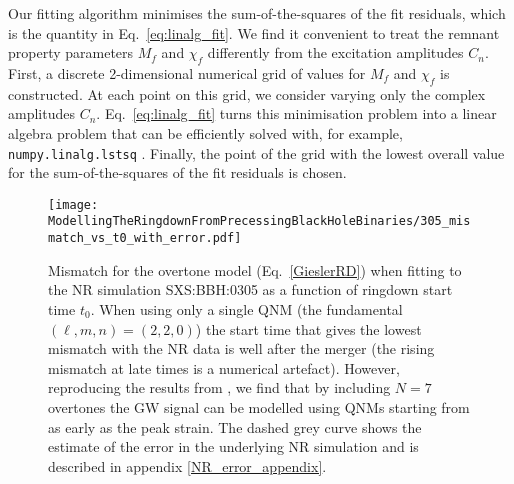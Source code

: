 Our fitting algorithm minimises the sum-of-the-squares of the fit residuals, which is the quantity in Eq.~\ref{eq:linalg_fit}. 
We find it convenient to treat the remnant property parameters $M_f$ and $\chi_f$ differently from the excitation amplitudes $C_n$. 
First, a discrete 2-dimensional numerical grid of values for 
$M_f$ and $\chi_f$ is constructed.
At each point on this grid, we consider varying only the complex amplitudes $C_n$. 
Eq.~\ref{eq:linalg_fit} turns this minimisation problem into a linear algebra problem that can be efficiently solved with, for example, \texttt{numpy.linalg.lstsq} \cite{numpy}.
Finally, the point of the grid with the lowest overall value for the sum-of-the-squares of the fit residuals is chosen.

\begin{figure}[t]
    \centering
    \texttt{[image: ModellingTheRingdownFromPrecessingBlackHoleBinaries/305\_mismatch\_vs\_t0\_with\_error.pdf]}
    \caption[Mismatch as a function of ringdown start time for an overtone model fitted to SXS:BBH:0305]{ 
    Mismatch for the overtone model (Eq.~\ref{GieslerRD}) when fitting to the NR simulation SXS:BBH:0305 as a function of ringdown start time $t_0$. When using only a single QNM (the fundamental $(\ell,m,n)=(2,2,0)$) the start time that gives the lowest mismatch with the NR data is well after the merger (the rising mismatch at late times is a numerical artefact). However, reproducing the results from \cite{overtones}, we find that by including $N=7$ overtones the GW signal can be modelled using QNMs starting from as early as the peak strain. The dashed grey curve shows the estimate of the error in the underlying NR simulation and is described in appendix \ref{NR_error_appendix}.}
	\label{305_mismatch_vs_t0}
\end{figure}

